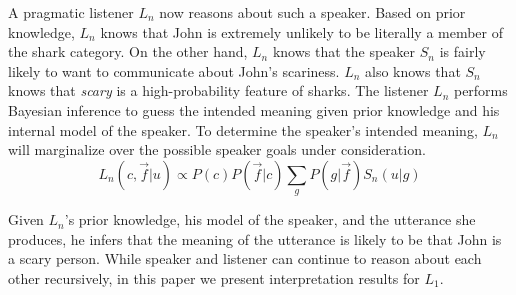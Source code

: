 \documentclass[10pt,letterpaper]{article}
\begin{document}
A pragmatic listener $L_n$ now reasons about such a speaker. Based on prior knowledge, $L_n$ knows that John is extremely unlikely to be literally a member of the shark category. On the other hand, $L_n$ knows that the speaker $S_n$ is fairly likely to want to communicate about John's scariness. $L_n$ also knows that $S_n$ knows that \emph{scary} is a high-probability feature of sharks. The listener $L_n$ performs Bayesian inference to guess the intended meaning given prior knowledge and his internal model of the speaker. To determine the speaker's intended meaning, $L_n$ will marginalize over the possible speaker goals under consideration.
$$
L_n (c, \vec f | u) \propto P(c) P(\vec f | c) \sum_{g}{P (g|\vec f) S_{n} (u|g)}
$$

Given $L_n$'s prior knowledge, his model of the speaker, and the utterance she produces, he infers that the meaning of the utterance is likely to be that John is a scary person. While speaker and listener can continue to reason about each other recursively, in this paper we present interpretation results for $L_1$.
\end{document}
